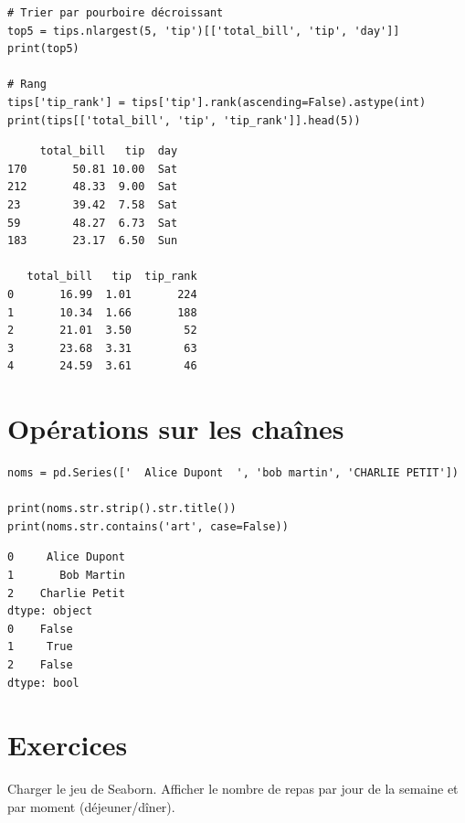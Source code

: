 \begin{codeblock}[title=\textbf{Python --- Tri}]
\begin{verbatim}
# Trier par pourboire décroissant
top5 = tips.nlargest(5, 'tip')[['total_bill', 'tip', 'day']]
print(top5)

# Rang
tips['tip_rank'] = tips['tip'].rank(ascending=False).astype(int)
print(tips[['total_bill', 'tip', 'tip_rank']].head(5))
\end{verbatim}
\end{codeblock}

\begin{codeoutput}
\begin{verbatim}
     total_bill   tip  day
170       50.81 10.00  Sat
212       48.33  9.00  Sat
23        39.42  7.58  Sat
59        48.27  6.73  Sat
183       23.17  6.50  Sun

   total_bill   tip  tip_rank
0       16.99  1.01       224
1       10.34  1.66       188
2       21.01  3.50        52
3       23.68  3.31        63
4       24.59  3.61        46
\end{verbatim}
\end{codeoutput}

\section{Op\'erations sur les cha\^ines}

\begin{codeblock}[title=\textbf{Python --- Accesseur \texttt{.str}}]
\begin{verbatim}
noms = pd.Series(['  Alice Dupont  ', 'bob martin', 'CHARLIE PETIT'])

print(noms.str.strip().str.title())
print(noms.str.contains('art', case=False))
\end{verbatim}
\end{codeblock}

\begin{codeoutput}
\begin{verbatim}
0     Alice Dupont
1       Bob Martin
2    Charlie Petit
dtype: object
0    False
1     True
2    False
dtype: bool
\end{verbatim}
\end{codeoutput}

\section{Exercices}

\begin{exercice}[$\star$]
Charger le jeu  de Seaborn. Afficher le nombre de repas par jour de la semaine et par moment (d\'ejeuner/d\^iner).
\end{exercice}

